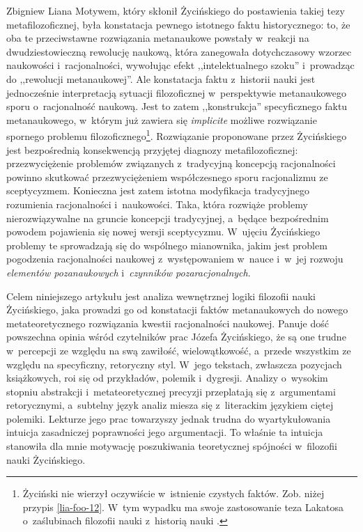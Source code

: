 \begin{artplenv}{Zbigniew Liana}
Motywem, który skłonił Życińskiego do postawienia takiej tezy metafilozoficznej, była konstatacja pewnego istotnego
faktu historycznego: to, że oba te przeciwstawne rozwiązania metanaukowe powstały w~reakcji na dwudziestowieczną
rewolucję naukową, która zanegowała dotychczasowy wzorzec naukowości i~racjonalności, wywołując efekt ,,intelektualnego
szoku'' i~prowadząc do ,,rewolucji metanaukowej''. Ale konstatacja faktu z~historii nauki jest jednocześnie interpretacją
sytuacji filozoficznej w~perspektywie metanaukowego sporu o~racjonalność naukową. Jest to zatem ,,konstrukcja''
specyficznego faktu metanaukowego, w~którym już zawiera się \textit{implicite} możliwe rozwiązanie spornego problemu
filozoficznego\footnote{Życiński nie wierzył oczywiście w~istnienie czystych faktów. Zob. niżej przypis \ref{lia-foo-12}. W~tym
wypadku ma swoje zastosowanie teza Lakatosa o~zaślubinach filozofii nauki z~historią nauki
\parencites[zob.][s.~121n]{zycinski_jezyk_1983}[s.~26]{zycinski_structure_1988}[s.~47]{zycinski_struktura_2013}.
}. Rozwiązanie proponowane przez
Życińskiego jest bezpośrednią konsekwencją przyjętej diagnozy metafilozoficznej: przezwyciężenie problemów związanych z~tradycyjną
koncepcją racjonalności powinno skutkować przezwyciężeniem współczesnego sporu racjonalizmu ze sceptycyzmem.
Konieczna jest zatem istotna modyfikacja tradycyjnego rozumienia racjonalności i~naukowości. Taka, która rozwiąże
problemy nierozwiązywalne na gruncie koncepcji tradycyjnej, a~będące bezpośrednim powodem pojawienia się nowej wersji
sceptycyzmu. W~ujęciu Życińskiego problemy te sprowadzają się do wspólnego mianownika, jakim jest problem pogodzenia
racjonalności naukowej z~występowaniem w~nauce i~w~jej rozwoju \textit{elementów pozanaukowych} i~\textit{czynników
pozaracjonalnych}.

Celem niniejszego artykułu jest analiza wewnętrznej logiki filozofii nauki Życińskiego, jaka prowadzi go od konstatacji
faktów metanaukowych do nowego metateoretycznego rozwiązania kwestii racjonalności naukowej. Panuje dość powszechna
opinia wśród czytelników prac Józefa Życińskiego, że są one trudne w~percepcji ze względu na swą zawiłość,
wielowątkowość, a~przede wszystkim ze względu na specyficzny, retoryczny styl. W~jego tekstach, zwłaszcza pozycjach
książkowych, roi się od przykładów, polemik i~dygresji. Analizy o~wysokim stopniu abstrakcji i~metateoretycznej
precyzji przeplatają się z~argumentami retorycznymi, a~subtelny język analiz miesza się z~literackim językiem ciętej
polemiki. Lekturze jego prac towarzyszy jednak trudna do wyartykułowania intuicja zasadniczej poprawności jego
argumentacji. To właśnie ta intuicja stanowiła dla mnie motywację poszukiwania teoretycznej spójności w~filozofii nauki
Życińskiego.


\end{artplenv}
